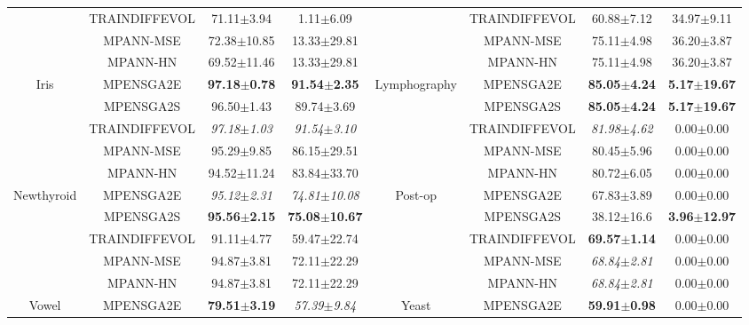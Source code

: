 \begin{landscape}
\begin{longtable}{cccccccc}
\rowcolor[rgb]{0.86,0.94,1} & TRAINDIFFEVOL & 71.11$\pm$3.94 & 1.11$\pm$6.09 &  &
TRAINDIFFEVOL & 60.88$\pm$7.12 & 34.97$\pm$9.11 \\
\rowcolor[rgb]{0.86,0.94,1} & MPANN-MSE & 72.38$\pm$10.85 & 13.33$\pm$29.81 &  & MPANN-MSE
& 75.11$\pm$4.98 & 36.20$\pm$3.87 \\
\rowcolor[rgb]{0.86,0.94,1} & MPANN-HN & 69.52$\pm$11.46 & 13.33$\pm$29.81 &  & MPANN-HN &
75.11$\pm$4.98 & 36.20$\pm$3.87  \\ \hline
\rowcolor[rgb]{0.86,0.94,1}Iris & MPENSGA2E & \textbf{97.18$\pm$0.78} &
\textbf{91.54$\pm$2.35} & Lymphography & MPENSGA2E & \textbf{85.05$\pm$4.24} &
\textbf{5.17$\pm$19.67} \\
\rowcolor[rgb]{0.86,0.94,1} & MPENSGA2S & 96.50$\pm$1.43\textbf{} & 89.74$\pm$3.69 &  &
MPENSGA2S & \textbf{85.05$\pm$4.24} & \textbf{5.17$\pm$19.67} \\
\rowcolor[rgb]{0.86,0.94,1}& TRAINDIFFEVOL & \textit{97.18$\pm$1.03} &
\textit{91.54$\pm$3.10} &  & TRAINDIFFEVOL & \textit{81.98$\pm$4.62} & 0.00$\pm$0.00 \\
\rowcolor[rgb]{0.86,0.94,1}& MPANN-MSE & 95.29$\pm$9.85 & 86.15$\pm$29.51 &  & MPANN-MSE
& 80.45$\pm$5.96 & 0.00$\pm$0.00 \\
\rowcolor[rgb]{0.86,0.94,1} & MPANN-HN & 94.52$\pm$11.24 & 83.84$\pm$33.70 &  & MPANN-HN &
80.72$\pm$6.05 & 0.00$\pm$0.00 \\ \hline
\rowcolor[rgb]{0.86,0.94,1}Newthyroid & MPENSGA2E &
\textit{95.12$\pm$2.31}\textbf{\textit{}} & \textit{74.81$\pm$10.08} & Post-op & MPENSGA2E
& 67.83$\pm$3.89 & 0.00$\pm$0.00\textbf{} \\
\rowcolor[rgb]{0.86,0.94,1} & MPENSGA2S & \textbf{95.56$\pm$2.15} &
\textbf{75.08$\pm$10.67} &  & MPENSGA2S & 38.12$\pm$16.6 & \textbf{3.96$\pm$12.97} \\
\rowcolor[rgb]{0.86,0.94,1}& TRAINDIFFEVOL & 91.11$\pm$4.77 & 59.47$\pm$22.74 &  &
TRAINDIFFEVOL & \textbf{69.57$\pm$1.14} & 0.00$\pm$0.00 \\
\rowcolor[rgb]{0.86,0.94,1} & MPANN-MSE & 94.87$\pm$3.81 & 72.11$\pm$22.29 &  & MPANN-MSE
& \textit{68.84$\pm$2.81} & 0.00$\pm$0.00 \\
\rowcolor[rgb]{0.86,0.94,1} & MPANN-HN & 94.87$\pm$3.81 & 72.11$\pm$22.29 &  & MPANN-HN &
\textit{68.84$\pm$2.81} & 0.00$\pm$0.00 \\ \hline
\rowcolor[rgb]{0.86,0.94,1}Vowel & MPENSGA2E & \textbf{79.51$\pm$3.19} &
\textit{57.39$\pm$9.84} & Yeast & MPENSGA2E & \textbf{59.91$\pm$0.98} & 0.00$\pm$0.00 \\

\end{longtable}
\end{landscape}
